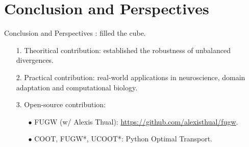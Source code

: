 \documentclass{beamer}
\begin{document}
\section{Conclusion and Perspectives}
\begin{frame}{Conclusion and Perspectives}
\scriptsize
\vspace{0.2cm}
{}: filled the cube.
\vspace{0.1cm}
\begin{enumerate}
  \setlength\itemsep{0.1cm}
  \item[1.] Theoritical contribution: established the robustness of unbalanced divergences.
  \item[2.] Practical contribution: real-world applications in neuroscience, domain adaptation and computational biology.
  \item[3.] Open-source contribution:
  \begin{itemize}
    \setlength\itemindent{5pt}
    \scriptsize
    \setlength\itemsep{0.1cm}
    \item[$\bullet$] FUGW (w/ Alexis Thual): \url{https://github.com/alexisthual/fugw}.
    \item[$\bullet$] COOT, FUGW*, UCOOT*: Python Optimal Transport.
  \end{itemize}
\end{enumerate}


\end{frame}
\end{document}
